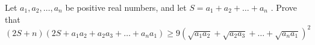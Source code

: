 Let $a_1,a_2,\ldots ,a_n$ be positive real numbers, and let $S=a_1+a_2 +\ldots +a_n$ . Prove that\[(2S+n)(2S+a_1a_2+a_2a_3+\ldots +a_na_1)\ge 9(\sqrt{a_1a_2}+\sqrt{a_2a_3}+\ldots +\sqrt{a_na_1})^2 \]